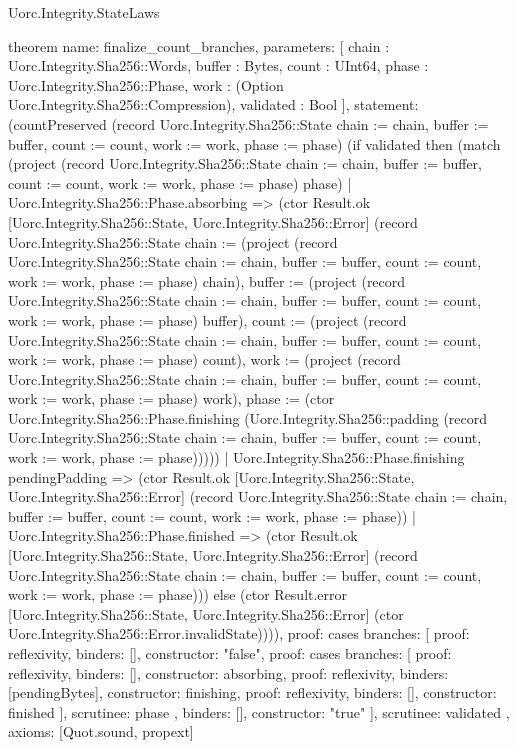 \begin{lexlean}{Uorc.Integrity.StateLaws}
\begin{semanticmodule}
theorem{
  name: finalize_count_branches,
  parameters: [
    chain : Uorc.Integrity.Sha256::Words,
    buffer : Bytes,
    count : UInt64,
    phase : Uorc.Integrity.Sha256::Phase,
    work : (Option Uorc.Integrity.Sha256::Compression),
    validated : Bool
  ],
  statement: (countPreserved (record Uorc.Integrity.Sha256::State {chain := chain, buffer := buffer, count := count, work := work, phase := phase}) (if validated then (match (project (record Uorc.Integrity.Sha256::State {chain := chain, buffer := buffer, count := count, work := work, phase := phase}) phase)
    | Uorc.Integrity.Sha256::Phase.absorbing => (ctor Result.ok [Uorc.Integrity.Sha256::State, Uorc.Integrity.Sha256::Error] (record Uorc.Integrity.Sha256::State {chain := (project (record Uorc.Integrity.Sha256::State {chain := chain, buffer := buffer, count := count, work := work, phase := phase}) chain), buffer := (project (record Uorc.Integrity.Sha256::State {chain := chain, buffer := buffer, count := count, work := work, phase := phase}) buffer), count := (project (record Uorc.Integrity.Sha256::State {chain := chain, buffer := buffer, count := count, work := work, phase := phase}) count), work := (project (record Uorc.Integrity.Sha256::State {chain := chain, buffer := buffer, count := count, work := work, phase := phase}) work), phase := (ctor Uorc.Integrity.Sha256::Phase.finishing (Uorc.Integrity.Sha256::padding (record Uorc.Integrity.Sha256::State {chain := chain, buffer := buffer, count := count, work := work, phase := phase})))}))
    | Uorc.Integrity.Sha256::Phase.finishing pendingPadding => (ctor Result.ok [Uorc.Integrity.Sha256::State, Uorc.Integrity.Sha256::Error] (record Uorc.Integrity.Sha256::State {chain := chain, buffer := buffer, count := count, work := work, phase := phase}))
    | Uorc.Integrity.Sha256::Phase.finished => (ctor Result.ok [Uorc.Integrity.Sha256::State, Uorc.Integrity.Sha256::Error] (record Uorc.Integrity.Sha256::State {chain := chain, buffer := buffer, count := count, work := work, phase := phase}))) else (ctor Result.error [Uorc.Integrity.Sha256::State, Uorc.Integrity.Sha256::Error] (ctor Uorc.Integrity.Sha256::Error.invalidState)))),
  proof: cases{
    branches: [
      {proof: reflexivity{}, binders: [], constructor: "false"},
      {
        proof: cases{
          branches: [
            {proof: reflexivity{}, binders: [], constructor: absorbing},
            {proof: reflexivity{}, binders: [pendingBytes], constructor: finishing},
            {proof: reflexivity{}, binders: [], constructor: finished}
          ],
          scrutinee: phase
        },
        binders: [],
        constructor: "true"
      }
    ],
    scrutinee: validated
  },
  axioms: [Quot.sound, propext]
}


\end{semanticmodule}
\end{lexlean}
